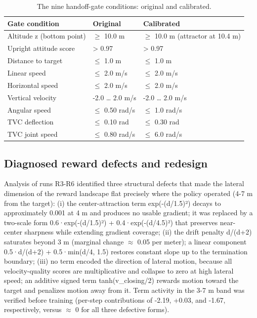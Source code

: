 \documentclass[11pt,a4paper]{article}
\begin{document}
\begin{table}[!ht]
\centering
\caption{The nine handoff-gate conditions: original and calibrated.}
\label{tab:handoff_gates}
\vspace{1ex}
\begin{tabular}{lll}
\toprule
\textbf{Gate condition} & \textbf{Original} & \textbf{Calibrated} \\
\midrule
Altitude z (bottom point) & $\ge$ 10.0 m & $\ge$ 10.0 m (attractor at 10.4 m) \\
Upright attitude score & > 0.97 & > 0.97 \\
Distance to target & $\le$ 1.0 m & $\le$ 1.0 m \\
Linear speed & $\le$ 2.0 m/s & $\le$ 2.0 m/s \\
Horizontal speed & $\le$ 2.0 m/s & $\le$ 2.0 m/s \\
Vertical velocity & -2.0 … 2.0 m/s & -2.0 … 2.0 m/s \\
Angular speed & $\le$ 0.50 rad/s & $\le$ 1.0 rad/s \\
TVC deflection & $\le$ 0.10 rad & $\le$ 0.30 rad \\
TVC joint speed & $\le$ 0.80 rad/s & $\le$ 6.0 rad/s \\
\bottomrule
\end{tabular}
\end{table}


\subsection{Diagnosed reward defects and redesign}

Analysis of runs R3-R6 identified three structural defects that made the lateral dimension of the reward landscape flat precisely where the policy operated (4-7 m from the target): (i) the center-attraction term exp(-(d/1.5)²) decays to approximately 0.001 at 4 m and produces no usable gradient; it was replaced by a two-scale form 0.6·exp(-(d/1.5)²) + 0.4·exp(-(d/4.5)²) that preserves near-center sharpness while extending gradient coverage; (ii) the drift penalty d/(d+2) saturates beyond 3 m (marginal change $\approx$ 0.05 per meter); a linear component 0.5·d/(d+2) + 0.5·min(d/4, 1.5) restores constant slope up to the termination boundary; (iii) no term encoded the direction of lateral motion, because all velocity-quality scores are multiplicative and collapse to zero at high lateral speed; an additive signed term tanh(v\_closing/2) rewards motion toward the target and penalizes motion away from it. Term activity in the 3-7 m band was verified before training (per-step contributions of -2.19, +0.03, and -1.67, respectively, versus $\approx$ 0 for all three defective forms).
\end{document}

